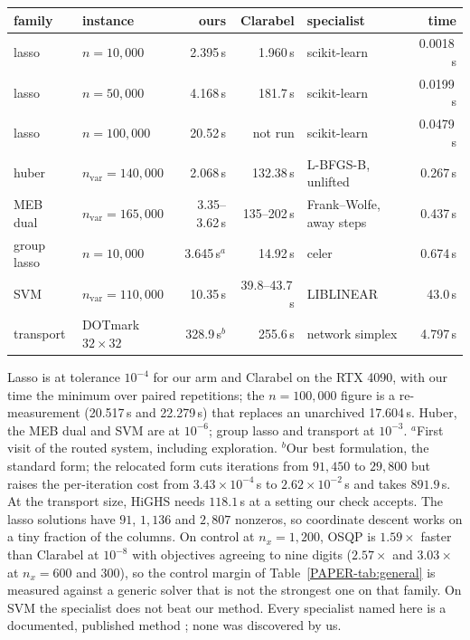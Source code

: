 \documentclass[11pt]{article}
\begin{document}
\begin{center}
\small
\begin{tabular}{p{2.1cm}p{2.3cm}rrp{2.6cm}r}
\toprule
family & instance & ours & Clarabel & specialist & time \\
\midrule
lasso & $n = 10{,}000$ & 2.395\,s & 1.960\,s & scikit-learn & 0.0018\,s \\
lasso & $n = 50{,}000$ & 4.168\,s & 181.7\,s & scikit-learn & 0.0199\,s \\
lasso & $n = 100{,}000$ & 20.52\,s & not run & scikit-learn & 0.0479\,s \\
huber & $n_{\mathrm{var}} = 140{,}000$ & 2.068\,s & 132.38\,s & L-BFGS-B, unlifted & 0.267\,s \\
MEB dual & $n_{\mathrm{var}} = 165{,}000$ & 3.35--3.62\,s & 135--202\,s & Frank--Wolfe, away steps & 0.437\,s \\
group lasso & $n = 10{,}000$ & 3.645\,s$^{a}$ & 14.92\,s & celer & 0.674\,s \\
SVM & $n_{\mathrm{var}} = 110{,}000$ & 10.35\,s & 39.8--43.7\,s & LIBLINEAR & 43.0\,s \\
transport & DOTmark $32\times32$ & 328.9\,s$^{b}$ & 255.6\,s & network simplex & 4.797\,s \\
\bottomrule
\end{tabular}
\end{center}

Lasso is at tolerance $10^{-4}$ for our arm and Clarabel on the RTX 4090, with
our time the minimum over paired repetitions; the $n = 100{,}000$ figure is a
re-measurement (20.517\,s and 22.279\,s) that replaces an unarchived 17.604\,s.
Huber, the MEB dual and SVM are at $10^{-6}$; group lasso and transport at
$10^{-3}$. $^{a}$First visit of the routed system, including exploration.
$^{b}$Our best formulation, the standard form; the relocated form cuts
iterations from $91{,}450$ to $29{,}800$ but raises the per-iteration cost from
$3.43\times10^{-4}$\,s to $2.62\times10^{-2}$\,s and takes $891.9$\,s. At the
transport size, HiGHS needs $118.1$\,s at a setting our check accepts. The
lasso solutions have $91$, $1{,}136$ and $2{,}807$ nonzeros, so coordinate
descent works on a tiny fraction of the columns. On control at $n_x = 1{,}200$,
OSQP is $1.59\times$ faster than Clarabel at $10^{-8}$ with objectives agreeing
to nine digits ($2.57\times$ and $3.03\times$ at $n_x = 600$ and $300$), so the
control margin of Table~\ref{PAPER-tab:general} is measured against a generic solver
that is not the strongest one on that family. On SVM the specialist does not
beat our method. Every specialist named here is a documented, published method
\citep{Pedregosa2011Scikit,Massias2018Celer,Byrd1995Limited,Yildirim2008Two,LacosteJulien2015Global,Fan2008LIBLINEAR,Bonneel2011Displacement,Flamary2021POT};
none was discovered by us.
\end{document}
